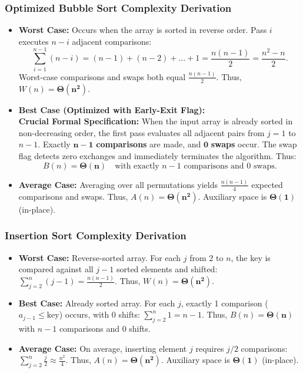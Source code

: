 \documentclass[10pt,a4paper]{article}
\theoremstyle{definition}
\begin{document}
\subsubsection{Optimized Bubble Sort Complexity Derivation}
\begin{itemize}[leftmargin=*,itemsep=1pt,topsep=1pt]
    \item \textbf{Worst Case:} Occurs when the array is sorted in reverse order. Pass $i$ executes $n - i$ adjacent comparisons:
    $$\sum_{i=1}^{n-1} (n - i) = (n - 1) + (n - 2) + \dots + 1 = \frac{n(n - 1)}{2} = \frac{n^2 - n}{2}.$$
    Worst-case comparisons and swaps both equal $\frac{n(n-1)}{2}$. Thus, $W(n) = \mathbf{\Theta(n^2)}$.
    \item \textbf{Best Case (Optimized with Early-Exit Flag):}\\
    \textbf{Crucial Formal Specification:} When the input array is already sorted in non-decreasing order, the first pass evaluates all adjacent pairs from $j=1$ to $n-1$. Exactly $\mathbf{n-1}$ \textbf{comparisons} are made, and $\mathbf{0}$ \textbf{swaps} occur. The swap flag detects zero exchanges and immediately terminates the algorithm. Thus:
    \begin{equation}
    B(n) = \mathbf{\Theta(n)} \quad \text{with exactly } n-1 \text{ comparisons and } 0 \text{ swaps.}
    \end{equation}
    \item \textbf{Average Case:} Averaging over all permutations yields $\frac{n(n-1)}{4}$ expected comparisons and swaps. Thus, $A(n) = \mathbf{\Theta(n^2)}$. Auxiliary space is $\mathbf{\Theta(1)}$ (in-place).
\end{itemize}

\subsubsection{Insertion Sort Complexity Derivation}
\begin{itemize}[leftmargin=*,itemsep=1pt,topsep=1pt]
    \item \textbf{Worst Case:} Reverse-sorted array. For each $j$ from 2 to $n$, the key is compared against all $j-1$ sorted elements and shifted: $\sum_{j=2}^n (j - 1) = \frac{n(n-1)}{2}$. Thus, $W(n) = \mathbf{\Theta(n^2)}$.
    \item \textbf{Best Case:} Already sorted array. For each $j$, exactly 1 comparison ($a_{j-1} \le \text{key}$) occurs, with 0 shifts: $\sum_{j=2}^n 1 = n - 1$. Thus, $B(n) = \mathbf{\Theta(n)}$ with $n-1$ comparisons and 0 shifts.
    \item \textbf{Average Case:} On average, inserting element $j$ requires $j/2$ comparisons: $\sum_{j=2}^n \frac{j}{2} \approx \frac{n^2}{4}$. Thus, $A(n) = \mathbf{\Theta(n^2)}$. Auxiliary space is $\mathbf{\Theta(1)}$ (in-place).
\end{itemize}
\end{document}
